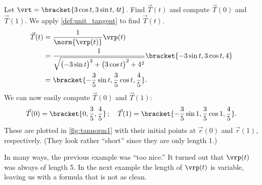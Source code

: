 \begin{example}\label{ex_tannorm1}%
Let $\vrt =\bracket{3\cos t, 3\sin t, 4t}$. Find $\vec T(t)$ and compute $\vec T(0)$ and $\vec T(1)$.
\solution
We apply \autoref{def:unit_tangent} to find $\vec T(t)$. 
\begin{align*}
\vec T(t) &= \frac1{\norm{\vrp(t)}}\vrp(t) \\
				&=\frac{1}{\sqrt{\bigl(-3\sin t\bigr)^2+\bigl(3\cos t\bigr)^2+ 4^2}}\bracket{-3\sin t,3\cos t, 4}\\
				&=\bracket{-\frac35\sin t,\frac35\cos t,\frac45}.
\end{align*}
We can now easily compute $\vec T(0)$ and $\vec T(1)$:
%
%
\[
\vec T(0) =\bracket{0,\frac35,\frac45}\,;\quad \vec T(1) =\bracket{-\frac35\sin 1,\frac35\cos 1,\frac45}%
.
\]
These are plotted in \autoref{fig:tannorm1} with their initial points at $\vec r(0)$ and $\vec r(1)$, respectively. (They look rather ``short'' since they are only length 1.)
%
\end{example}

In many ways, the previous example was ``too nice.'' It turned out that $\vrp(t)$ was always of length 5. In the next example the length of $\vrp(t)$ is variable, leaving us with a formula that is not as clean.

